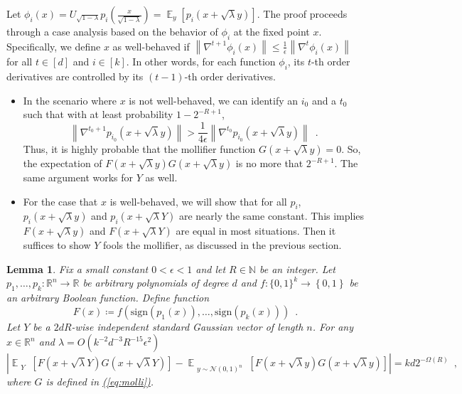 \documentclass[12pt]{article}
\newtheorem{lemma}[theorem]{Lemma}
\newcommand{\eq}[1]{\hyperref[eq:#1]{(\ref*{eq:#1})}}
\newcommand{\N}{\mathbb{N}}  \newcommand{\R}{\mathbb{R}} \newcommand{\C}{\mathbb{C}} \newcommand{\U}{\mathbb{U}} \renewcommand{\d}{\mathrm{d}} \DeclareMathOperator*{\E}{\mathbb{E}}  \newcommand{\so}{\mathrm{SO}} \newcommand{\s}{\mathrm{S}} \newcommand{\su}{\mathrm{SU}} \renewcommand{\i}{\mathrm{i}} \newcommand{\A}{\mathcal{A}}  \newcommand{\B}{\mathcal{B}} \newcommand{\CC}{\mathcal{C}} \newcommand{\D}{\mathcal{D}} \newcommand{\F}{\mathcal{F}} \renewcommand{\H}{\mathcal{H}} \newcommand{\K}{\mathcal{K}} \newcommand{\NN}{\mathcal{N}} \newcommand{\V}{\mathcal{V}} \newcommand{\X}{\mathcal{X}} \newcommand{\Y}{\mathcal{Y}} \renewcommand{\S}{\mathcal{S}} \newcommand{\SR}{\mathcal{S}_{\R}} \newcommand{\SC}{\mathcal{S}_{\C}} \newcommand{\EE}{\mathcal{E}}  \newcommand{\PP}{\mathcal{P}} \newcommand{\KK}{\widetilde{K}} \newcommand{\LL}{\widetilde{L}} \newcommand{\W}{\widehat{W}} \newcommand{\f}{\hat{f}} \newcommand{\g}{\hat{g}} \newcommand{\h}{\hat{h}} \newcommand{\bit}[1]{\{0,1\}^{#1}} \newcommand{\wrt}{w.r.t.~} \newcommand{\us}{\overset{\$}{\leftarrow}} \newcommand{\set}[1]{\left\{#1\right\}} \newcommand{\lhs}{\mathrm{LHS}} \newcommand{\expec}[1]{\E\!\Br{#1}} \newcommand{\expect}[2]{\E_{\substack{#1}}\!\Br{#2}} \newcommand{\prob}[2]{\underset{#1}{\mathrm{Pr}}\!\Br{#2}} \newcommand{\cf}{\widetilde{f}} \newcommand{\cg}{\widetilde{g}} \newcommand{\ch}{\widetilde{h}} \newcommand{\ck}{\widetilde{K}} \newcommand{\rep}[2]{\br{#1}_{#2}} \newcommand{\AND}[1]{\mathrm{AND}\!\br{#1}}
\newcommand{\sign}[1]{\mathrm{sign}\!\br{#1}}
\newcommand{\grad}[2]{\nabla^{#1}{#2}}
\newcommand{\br}[1]{\left(#1\right)} \newcommand{\Br}[1]{\left[#1\right]} \newcommand{\st}[1]{\left\{#1\right\}} \newcommand{\tr}[1]{\mathrm{Tr}\!\Br{#1}} \newcommand{\abs}[1]{\left|#1 \right|} \newcommand{\norm}[1]{\left\lVert #1 \right\rVert} \newcommand{\agl}[2]{\theta^{\br{#1}}_{#2}} \newcommand{\aglp}[2]{{\theta'}^{\br{#1}}_{#2}} \newcommand{\lint}[1]{\left\lfloor#1\right\rfloor} \newcommand{\poly}[1]{\mathrm{poly}\!\br{#1}} \newcommand{\negl}[1]{\mathrm{negl}\!\br{#1}} \newcommand{\de}[1]{\mathrm{d}#1} \newcommand{\val}[1]{\mathrm{val}\!\br{#1}} \newcommand{\vall}[1]{\mathrm{val}\br{#1}} \newcommand{\nd}[1]{\mathcal{N}\!\br{#1}} \newcommand{\ketbratwo}[2]{\ket{#1} \hspace{-0.4em}\bra{#2}} \newcommand{\ketbra}[1]{\ketbratwo{#1}{#1}} \newcommand{\id}{\ensuremath{\mathds{1}}} \newcommand{\ogroup}[1]{\mathrm{O}\!\br{#1}} \newcommand{\ugroup}[1]{\mathrm{U}\!\br{#1}} \newcommand{\td}{\mathrm{TD}} \newcommand{\tv}[1]{\norm{#1}_{\mathrm{TV}}} \newcommand {\defeq} {\ensuremath{ \stackrel{\mathrm{def}}{=} }} \newcommand{\vdim}{\ensuremath{N}} \newcommand{\dimin}{\ensuremath{n}} \newcommand{\dimout}{\ensuremath{m}} \newcommand{\ncopy}{\ell} \newcommand{\hspacein}{\H_\mathrm{in}} \newcommand{\hspaceout}{\H_\mathrm{out}} \newcommand{\Sin}{\S(\hspacein)} \newcommand{\Sout}{\S(\hspaceout)} \newcommand{\haar}{\ensuremath{\mu}} \newcommand{\tensorhaar}{\ensuremath{\eta}} \newcommand{\tensorsrss}{\ensuremath{\nu}} \newcommand{\qadvice}{\ensuremath{\rho}} \newcommand{\tp}{\otimes} \newcommand{\wone}[2]{W_1\!\br{#1,#2}}
\begin{document}
Let $\phi_i(x) = U_{\sqrt{1-\lambda}} p_i\!\br{\frac{x}{\sqrt{1-\lambda}}} = \E_y[p_i(x+\sqrt{\lambda}y)]$.
The proof proceeds through a case analysis
based on the behavior of $\phi_i$ at the fixed point $x$.
Specifically, we define $x$ as well-behaved if
$\norm{\grad{t+1}{\phi_i(x)}} \leq \frac{1}{\epsilon}\norm{\grad{t}{\phi_i(x)}}$ for all $t\in[d]$ and $i\in[k]$.
In other words, for each function $\phi_i$,
its $t$-th order derivatives are controlled by its
$(t-1)$-th order derivatives.
\begin{itemize}
	\item In the scenario where $x$ is not well-behaved,
	we can identify an $i_0$ and a $t_0$ such that
	with at least probability $1-2^{-R+1}$,
	\[
	\norm{ \grad{t_0+1}{p_{i_0}(x+\sqrt{\lambda}y)}}> \frac{1}{4\epsilon} \norm{ \grad{t_0}{p_{i_0}(x+\sqrt{\lambda}y)}} \enspace .
	\]
	Thus, it is highly probable that the mollifier function
	$G(x+\sqrt{\lambda}y)=0$.
	So, the expectation of $F(x+\sqrt{\lambda}y)G(x+\sqrt{\lambda}y)$ is no more that $2^{-R+1}$.
	The same argument works for $Y$ as well.
	\item For the case that $x$ is well-behaved,
	we will show that for all $p_i$,
	${ p_i(x+\sqrt{\lambda}y) }$ and ${ p_i(x+\sqrt{\lambda}Y) }$ are nearly the same constant. This implies
	$F(x+\sqrt{\lambda}y)$ and $F(x+\sqrt{\lambda}Y)$ are equal in most situations.
	Then it suffices to show $Y$ fools the mollifier,
	as discussed in the previous section.
\end{itemize}

\begin{lemma}\label{lem:hybrid}
	Fix a small constant $0<\epsilon<1$ and let $R\in\N$ be an integer. Let $p_1,\dots,p_k:\R^n \to \R$ be arbitrary polynomials of degree $d$ and $f:\bit{k}\to\st{0,1}$ be an arbitrary Boolean function.
	Define function
	\[
		F(x)\coloneqq f\!\br{\sign{p_1\!(x)},\dots,\sign{p_k\!(x)}}\enspace.
	\]
Let $Y$ be a $2dR$-wise independent standard Gaussian vector of length $n$.
	For any $x\in\R^n$ and $\lambda = O(k^{-2}d^{-3}R^{-15}\epsilon^2)$
	\[
	\abs{
		\expect{Y}{
			F(x+\sqrt{\lambda}Y)G(x+\sqrt{\lambda}Y)
		}
		-
		\expect{y\sim\NN\br{0,1}^n}{
			F(x+\sqrt{\lambda}y)G(x+\sqrt{\lambda}y)
		}
	} = kd2^{-\Omega(R)} \enspace ,
	\]
	where $G$ is defined in \eq{molli}.
\end{lemma}
\end{document}
